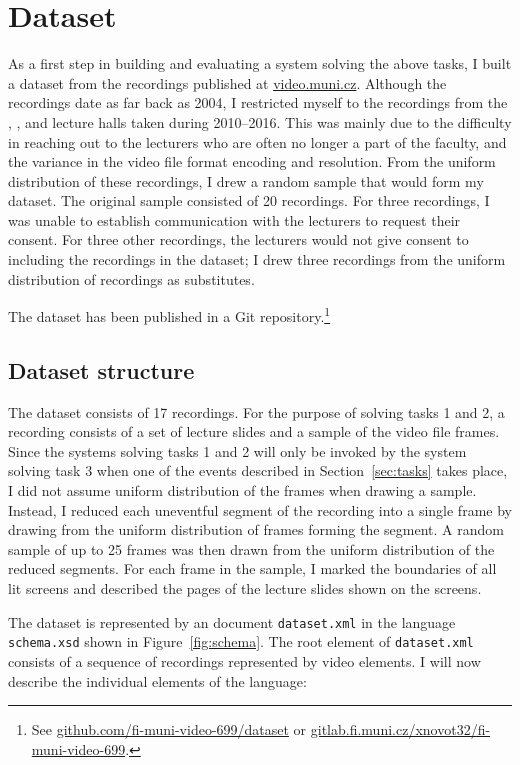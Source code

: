 \section{Dataset}
\label{sec:dataset}
As a first step in building and evaluating a system solving the above tasks, I
built a dataset from the recordings published at
\href{https://www.video.muni.cz}{video.muni.cz}.
Although the recordings date as far back as 2004, I restricted myself to the
recordings from the , , and  lecture halls taken
during 2010--2016. This was mainly due to the difficulty in reaching out to
the lecturers who are often no longer a part of the faculty, and the variance
in the video file format encoding and resolution. From the uniform distribution
of these recordings, I drew a random sample that would form my dataset.
The original sample consisted of 20 recordings. For three recordings, I was
unable to establish communication with the lecturers to request their consent.
For three other recordings, the lecturers would not give consent to including
the recordings in the dataset; I drew three recordings from the uniform
distribution of recordings as substitutes.

The dataset has been published in a Git repository.\footnote{See
  \href{https://github.com/fi-muni-video-699/dataset}%
       {github.com/fi-muni-video-699/dataset} or
  \href{https://gitlab.fi.muni.cz/xnovot32/fi-muni-video-699}%
       {gitlab.fi.muni.cz/xnovot32/fi-muni-video-699}.}

\subsection{Dataset structure}
The dataset consists of 17 recordings. For the purpose of solving tasks 1 and
2, a recording consists of a set of lecture slides and a sample of the video
file frames. Since the systems solving tasks 1 and 2 will only be invoked by
the system solving task 3 when one of the events described in
Section~\ref{sec:tasks} takes place, I did not assume uniform distribution of
the frames when drawing a sample. Instead, I reduced each uneventful segment of
the recording into a single frame by drawing from the uniform distribution of
frames forming the segment. A random sample of up to 25 frames was then drawn
from the uniform distribution of the reduced segments. For each frame in the
sample, I marked the boundaries of all lit screens and described the pages of
the lecture slides shown on the screens.

The dataset is represented by an  document \texttt{dataset.xml} in
the language \texttt{schema.xsd} shown in Figure~\ref{fig:schema}. The root
element of \texttt{dataset.xml} consists of a sequence of recordings
represented by video elements. I will now describe the individual elements of
the language:

